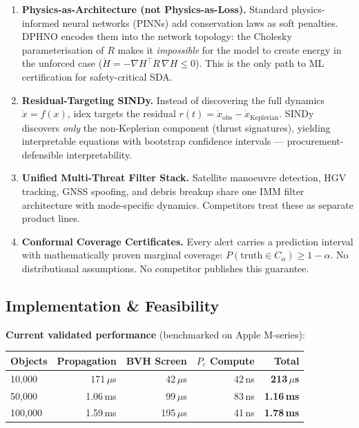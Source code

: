 \documentclass[11pt,a4paper]{article}
\begin{document}
\begin{enumerate}
\item \textbf{Physics-as-Architecture (not Physics-as-Loss).}
Standard physics-informed neural networks (PINNs) add conservation laws as
soft penalties. DPHNO encodes them into the network topology: the Cholesky
parameterisation of $R$ makes it \emph{impossible} for the model to create
energy in the unforced case ($\dot{H} = -\nabla H^\top R\,\nabla H \leq 0$).
This is the only path to ML certification for safety-critical SDA.

\item \textbf{Residual-Targeting SINDy.}
Instead of discovering the full dynamics $\dot{x} = f(x)$, idex targets the
residual $r(t) = \dot{x}_{\text{obs}} - \dot{x}_{\text{Keplerian}}$. SINDy
discovers \emph{only} the non-Keplerian component (thrust signatures), yielding
interpretable equations with bootstrap confidence intervals ---
procurement-defensible interpretability.

\item \textbf{Unified Multi-Threat Filter Stack.}
Satellite manoeuvre detection, HGV tracking, GNSS spoofing, and debris breakup
share one IMM filter architecture with mode-specific dynamics. Competitors
treat these as separate product lines.

\item \textbf{Conformal Coverage Certificates.}
Every alert carries a prediction interval with mathematically proven marginal
coverage: $P(\text{truth} \in C_\alpha) \geq 1 - \alpha$. No distributional
assumptions. No competitor publishes this guarantee.
\end{enumerate}

\subsection{Implementation \& Feasibility}

\textbf{Current validated performance} (benchmarked on Apple M-series):

\renewcommand{\arraystretch}{1.2}
\begin{tabularx}{\textwidth}{l r r r r}
\toprule
\textbf{Objects} & \textbf{Propagation} & \textbf{BVH Screen} & \textbf{$P_c$ Compute} & \textbf{Total} \\
\midrule
10,000  & 171\,$\mu$s  & 42\,$\mu$s  & 42\,ns  & \textbf{213\,$\mu$s} \\
50,000  & 1.06\,ms     & 99\,$\mu$s  & 83\,ns  & \textbf{1.16\,ms} \\
100,000 & 1.59\,ms     & 195\,$\mu$s & 41\,ns  & \textbf{1.78\,ms} \\
\bottomrule
\end{tabularx}
\end{document}
